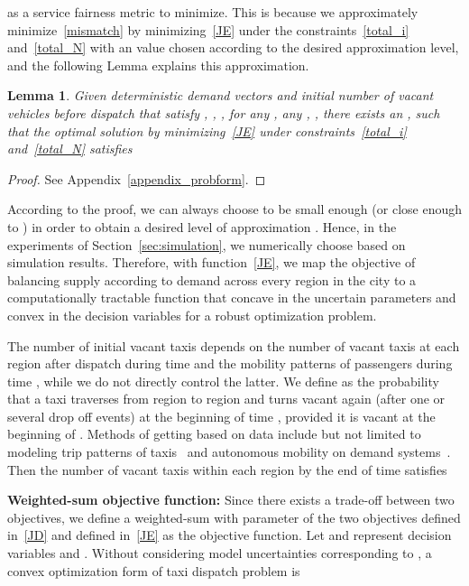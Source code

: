 \documentclass[10pt,twocolumn,twoside,english]{IEEEtran}
\newtheorem{lemma}{Lemma}
\begin{document}
as a service fairness metric to minimize. This is because we approximately minimize~\eqref{mismatch} by minimizing~\eqref{JE} under the constraints~\eqref{total_i} and~\eqref{total_N} with an  value chosen according to the desired approximation level, and the following Lemma explains this approximation.
\begin{lemma}
Given deterministic demand vectors  and initial number of vacant vehicles before dispatch  that satisfy , , , for any ,  any , , there exists an , such that the optimal solution  by minimizing~\eqref{JE} under constraints~\eqref{total_i} and~\eqref{total_N} satisfies

\label{jematch}
\end{lemma}
\begin{proof}
See Appendix~\ref{appendix_probform}.
\end{proof}
According to the proof, we can always choose  to be small enough (or close enough to ) in order to obtain a desired level of approximation . Hence, in the experiments of Section~\ref{sec:simulation}, we numerically choose  based on simulation results. Therefore, with function~\eqref{JE}, we map the objective of balancing supply according to demand across every region in the city to a computationally tractable function that concave in the uncertain parameters and convex in the decision variables for a robust optimization problem. 

The number of initial vacant taxis  depends on the number of vacant taxis at each region after dispatch during time  and the mobility patterns of passengers during time , while we do not directly control the latter. We define  as the probability that a taxi traverses from region  to region  and turns vacant again (after one or several drop off events) at the beginning of time , provided it is vacant at the beginning of . Methods of getting  based on data include but not limited to modeling trip patterns of taxis~\cite{taxi_Feiiccps15} and autonomous mobility on demand systems~\cite{mod}. Then the number of vacant taxis within each region  by the end of time  satisfies



\textbf{Weighted-sum objective function:} Since there exists a trade-off between two objectives, we define a weighted-sum with parameter  of the two objectives  defined in~\eqref{JD} and  defined in~\eqref{JE} as the objective function. Let  and  represent decision variables  and . Without considering model uncertainties corresponding to , a convex optimization form of taxi dispatch problem is 
\end{document}
